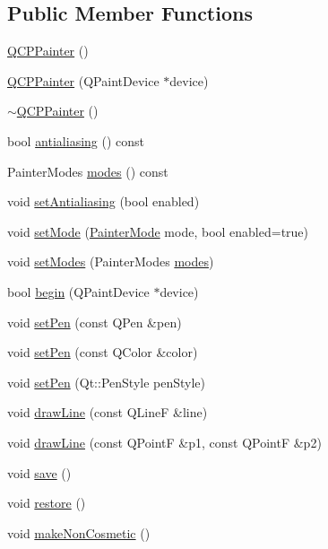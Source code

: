 \subsection*{Public Member Functions}
\begin{DoxyCompactItemize}
\item 
\hyperlink{class_q_c_p_painter_a3c52cb0f43f34573d29bea487da28fe8}{Q\+C\+P\+Painter} ()
\item 
\hyperlink{class_q_c_p_painter_ae58dbb1795ddc4351ab324dc9898aa22}{Q\+C\+P\+Painter} (Q\+Paint\+Device $\ast$device)
\item 
\hyperlink{class_q_c_p_painter_aa8491da26c0bf7704a93e2dcbb0c5ba1}{$\sim$\+Q\+C\+P\+Painter} ()
\item 
bool \hyperlink{class_q_c_p_painter_a13370d7996315a7150be2fc868da3d4a}{antialiasing} () const 
\item 
Painter\+Modes \hyperlink{class_q_c_p_painter_a99b89eaf5363faaa1e1e6162856f436c}{modes} () const 
\item 
void \hyperlink{class_q_c_p_painter_aaba1deb9188244d9ea65b035112b4d05}{set\+Antialiasing} (bool enabled)
\item 
void \hyperlink{class_q_c_p_painter_af6b1f7d2bbc548b10aa55d8b6ad49577}{set\+Mode} (\hyperlink{class_q_c_p_painter_a156cf16444ff5e0d81a73c615fdb156d}{Painter\+Mode} mode, bool enabled=true)
\item 
void \hyperlink{class_q_c_p_painter_a5fac93adc29c7c4dea9f3e171e9e635e}{set\+Modes} (Painter\+Modes \hyperlink{class_q_c_p_painter_a99b89eaf5363faaa1e1e6162856f436c}{modes})
\item 
bool \hyperlink{class_q_c_p_painter_a0a41146ccd619dceab6e25ec7b46b044}{begin} (Q\+Paint\+Device $\ast$device)
\item 
void \hyperlink{class_q_c_p_painter_af9c7a4cd1791403901f8c5b82a150195}{set\+Pen} (const Q\+Pen \&pen)
\item 
void \hyperlink{class_q_c_p_painter_a5c4d88f21564e156e88ef807f7cf0003}{set\+Pen} (const Q\+Color \&color)
\item 
void \hyperlink{class_q_c_p_painter_a25e76095aae41da0d08035060e5f81ca}{set\+Pen} (Qt\+::\+Pen\+Style pen\+Style)
\item 
void \hyperlink{class_q_c_p_painter_a0b4b1b9bd495e182c731774dc800e6e0}{draw\+Line} (const Q\+Line\+F \&line)
\item 
void \hyperlink{class_q_c_p_painter_ad1638db27929491b3f1beb74d6cbad5e}{draw\+Line} (const Q\+Point\+F \&p1, const Q\+Point\+F \&p2)
\item 
void \hyperlink{class_q_c_p_painter_a8fd6821ee6fecbfa04444c9062912abd}{save} ()
\item 
void \hyperlink{class_q_c_p_painter_a64908e6298d5bbd83457dc987cc3a022}{restore} ()
\item 
void \hyperlink{class_q_c_p_painter_a7e63fbcf47e35c6f2ecd11b8fef7c7d8}{make\+Non\+Cosmetic} ()
\end{DoxyCompactItemize}
